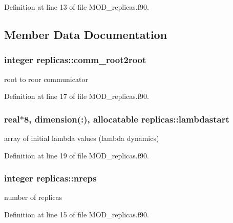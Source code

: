 Definition at line 13 of file M\-O\-D\-\_\-replicas.\-f90.



\subsection{Member Data Documentation}
\hypertarget{classreplicas_addae477c642cce272217efe213b8b095}{
\subsubsection[{comm\-\_\-root2root}]{\setlength{\rightskip}{0pt plus 5cm}integer replicas\-::comm\-\_\-root2root}}\label{classreplicas_addae477c642cce272217efe213b8b095}


root to roor communicator 



Definition at line 17 of file M\-O\-D\-\_\-replicas.\-f90.

\hypertarget{classreplicas_a824fbac4f1cb495207fdd32901803fb0}{
\subsubsection[{lambdastart}]{\setlength{\rightskip}{0pt plus 5cm}real$\ast$8, dimension(\-:), allocatable replicas\-::lambdastart}}\label{classreplicas_a824fbac4f1cb495207fdd32901803fb0}


array of initial lambda values (lambda dynamics) 



Definition at line 19 of file M\-O\-D\-\_\-replicas.\-f90.

\hypertarget{classreplicas_af0425acb44a782da3a96d7028c4372fa}{
\subsubsection[{nreps}]{\setlength{\rightskip}{0pt plus 5cm}integer replicas\-::nreps}}\label{classreplicas_af0425acb44a782da3a96d7028c4372fa}


number of replicas 



Definition at line 15 of file M\-O\-D\-\_\-replicas.\-f90.

